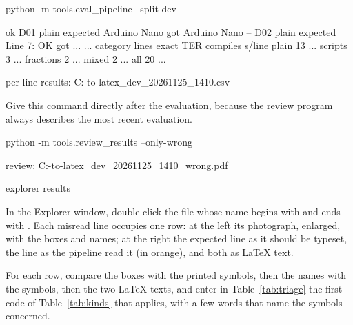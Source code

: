 

\label{st:devbase}
\begin{ps}
python -m tools.eval_pipeline --split dev
\end{ps}
\begin{out}
ok D01 plain     expected Arduino Nano                 got Arduino Nano
-- D02 plain     expected Line 7: OK                   got ...
...
category   lines   exact     TER  compiles  s/line
plain         13     ...%
scripts        3     ...%
fractions      2     ...%
mixed          2     ...%
all           20     ...%

per-line results: C:\camera-to-latex\results\eval_dev_20261125_1410.csv
\end{out}

\label{st:review}
Give this command directly after the evaluation, because the review program always describes
the most recent evaluation.
\begin{ps}
python -m tools.review_results --only-wrong
\end{ps}
\begin{out}
review: C:\camera-to-latex\results\review_dev_20261125_1410_wrong.pdf
\end{out}
\begin{ps}
explorer results
\end{ps}
In the Explorer window, double-click the file whose name begins with  and
ends with . Each misread line occupies one row: at the left its photograph,
enlarged, with the boxes and names; at the right the expected line as it should be typeset, the
line as the pipeline read it (in orange), and both as \LaTeX{} text.

\label{st:triage}
For each row, compare the boxes with the printed symbols, then the names with the symbols, then
the two \LaTeX{} texts, and enter in Table~\ref{tab:triage} the first code of
Table~\ref{tab:kinds} that applies, with a few words that name the symbols concerned.

